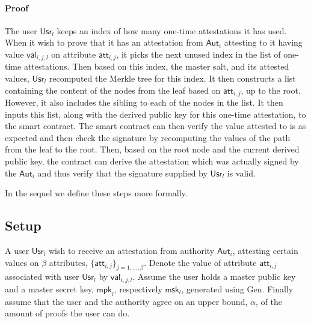 \documentclass[11pt]{article} %
\newcommand{\aut}{\ensuremath{\mathsf{Aut}_i}}
\newcommand{\att}{\ensuremath{\mathsf{att}_{i,j}}}
\newcommand{\val}{\ensuremath{\mathsf{val}_{i,j,l}}}
\newcommand{\usr}{\ensuremath{\mathsf{Usr}_l}}
\newcommand{\mpk}{\ensuremath{\mathsf{mpk}}}
\newcommand{\msk}{\ensuremath{\mathsf{msk}}}
\begin{document}
\paragraph{Proof}
The user $\usr$ keeps an index of how many one-time attestations it has used. When it wish to prove that it has an attestation from $\aut$ attesting to it having value $\val$ on attribute $\att$, it picks the next unused index in the list of one-time attestations. Then based on this index, the master salt, and its attested values, $\usr$ recomputed the Merkle tree for this index. It then constructs a list containing the content of the nodes from the leaf based on $\att$, up to the root. However, it also includes the sibling to each of the nodes in the list. It then inputs this list, along with the derived public key for this one-time attestation, to the smart contract. The smart contract can then verify the value attested to is as expected and then check the signature by recomputing the values of the path from the leaf to the root. Then, based on the root node and the current derived public key, the contract can derive the attestation which was actually signed by the $\aut$ and thus verify that the signature supplied by $\usr$ is valid.

In the sequel we define these steps more formally.

\subsection{Setup}
A user $\usr$ wish to receive an attestation from authority $\aut$, attesting certain values on $\beta$ attributes, $\{\att\}_{j=1, \dots, \beta}$. Denote the value of attribute $\att$ associated with user $\usr$ by $\val$. Assume the user holds a master public key and a master secret key, $\mpk_l$, respectively $\msk_l$, generated using $\mathrm{Gen}$. Finally assume that the user and the authority agree on an upper bound, $\alpha$, of the amount of proofs the user can do. 
\end{document}
